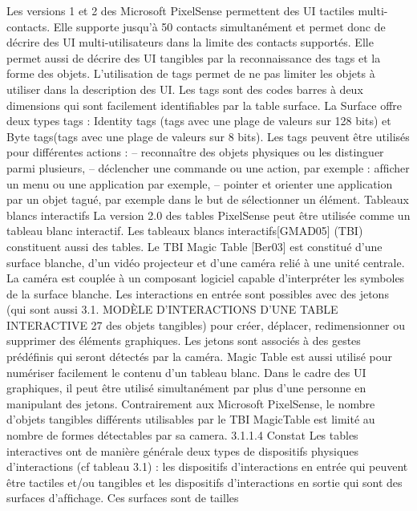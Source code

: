 \documentclass{article}
\begin{document}
Les versions 1 et 2 des Microsoft PixelSense permettent des UI tactiles multi-contacts. Elle supporte jusqu’\`{a} 50 contacts simultan\'{e}ment et permet donc de d\'{e}crire des UI multi-utilisateurs dans la
limite des contacts support\'{e}s. Elle permet aussi de d\'{e}crire des UI tangibles par la reconnaissance des
tags et la forme des objets. L’utilisation de tags permet de ne pas limiter les objets \`{a} utiliser dans la
description des UI. Les tags sont des codes barres \`{a} deux dimensions qui sont facilement identiﬁables
par la table surface. La Surface offre deux types tags : Identity tags (tags avec une plage de valeurs
sur 128 bits) et Byte tags(tags avec une plage de valeurs sur 8 bits). Les tags peuvent \^{e}tre utilis\'{e}s pour
diff\'{e}rentes actions :
– reconna\^{i}tre des objets physiques ou les distinguer parmi plusieurs,
– d\'{e}clencher une commande ou une action, par exemple : afﬁcher un menu ou une application
par exemple,
– pointer et orienter une application par un objet tagu\'{e}, par exemple dans le but de s\'{e}lectionner
un \'{e}l\'{e}ment.
Tableaux blancs interactifs
La version 2.0 des tables PixelSense peut \^{e}tre utilis\'{e}e comme un tableau blanc interactif. Les tableaux blancs interactifs[GMAD05] (TBI) constituent aussi des tables. Le
TBI Magic Table [Ber03] est constitu\'{e} d’une surface blanche, d’un vid\'{e}o projecteur et d’une cam\'{e}ra
reli\'{e} \`{a} une unit\'{e} centrale. La cam\'{e}ra est coupl\'{e}e \`{a} un composant logiciel capable d’interpr\'{e}ter les symboles de la surface blanche. Les interactions en entr\'{e}e sont possibles avec des jetons (qui sont aussi
3.1. MODÈLE D’INTERACTIONS D’UNE TABLE INTERACTIVE
27
des objets tangibles) pour cr\'{e}er, d\'{e}placer, redimensionner ou supprimer des \'{e}l\'{e}ments graphiques. Les
jetons sont associ\'{e}s \`{a} des gestes pr\'{e}d\'{e}ﬁnis qui seront d\'{e}tect\'{e}s par la cam\'{e}ra.
Magic Table est aussi utilis\'{e} pour num\'{e}riser facilement le contenu d’un tableau blanc. Dans le
cadre des UI graphiques, il peut \^{e}tre utilis\'{e} simultan\'{e}ment par plus d’une personne en manipulant des
jetons. Contrairement aux Microsoft PixelSense, le nombre d’objets tangibles diff\'{e}rents utilisables
par le TBI MagicTable est limit\'{e} au nombre de formes d\'{e}tectables par sa camera.
3.1.1.4
Constat
Les tables interactives ont de mani\`{e}re g\'{e}n\'{e}rale deux types de dispositifs physiques d’interactions
(cf tableau 3.1) : les dispositifs d’interactions en entr\'{e}e qui peuvent \^{e}tre tactiles et/ou tangibles et
les dispositifs d’interactions en sortie qui sont des surfaces d’afﬁchage. Ces surfaces sont de tailles
\end{document}
